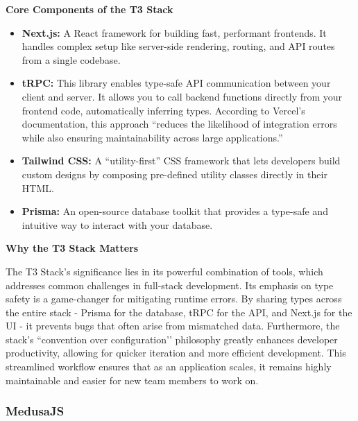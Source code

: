 \textbf{Core Components of the T3 Stack}
\begin{itemize}
  \item \textbf{Next.js:} A React framework for building fast, performant frontends. It handles complex setup like server-side rendering, routing, and API routes from a single codebase.
  \item \textbf{tRPC:} This library enables type-safe API communication between your client and server. It allows you to call backend functions directly from your frontend code, automatically inferring types. According to Vercel's documentation, this approach ``reduces the likelihood of integration errors while also ensuring maintainability across large applications.''
  \item \textbf{Tailwind CSS:} A ``utility-first'' CSS framework that lets developers build custom designs by composing pre-defined utility classes directly in their HTML.
  \item \textbf{Prisma:} An open-source database toolkit that provides a type-safe and intuitive way to interact with your database.
\end{itemize}


\textbf{Why the T3 Stack Matters}

The T3 Stack’s significance lies in its powerful combination of tools, which addresses common challenges in full-stack development. Its emphasis on type safety is a game-changer for mitigating runtime errors. By sharing types across the entire stack - Prisma for the database, tRPC for the API, and Next.js for the UI - it prevents bugs that often arise from mismatched data.
Furthermore, the stack’s ``convention over configuration’’ philosophy greatly enhances developer productivity, allowing for quicker iteration and more efficient development. This streamlined workflow ensures that as an application scales, it remains highly maintainable and easier for new team members to work on.

\subsubsection{MedusaJS}

